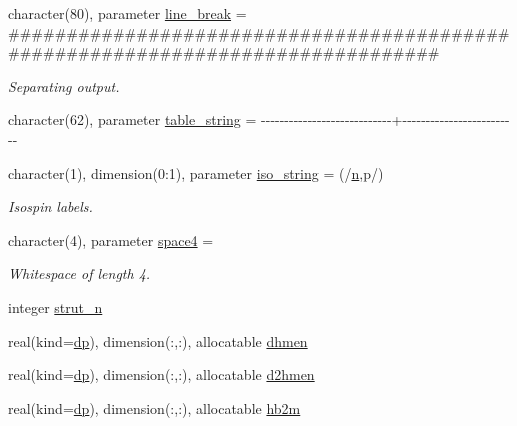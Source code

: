 \begin{DoxyCompactItemize}
character(80), parameter \mbox{\hyperlink{group__STRINGS_ga757aedae1ca22891e6971eee77226285}{line\+\_\+break}} = \textquotesingle{}\#\#\#\#\#\#\#\#\#\#\#\#\#\#\#\#\#\#\#\#\#\#\#\#\#\#\#\#\#\#\#\#\#\#\#\#\#\#\#\#\#\#\#\#\#\#\#\#\#\#\#\#\#\#\#\#\#\#\#\#\#\#\#\#\#\#\#\#\#\#\#\#\#\#\#\#\#\#\#\#\textquotesingle{}
\begin{DoxyCompactList}\small\item\em Separating output. \end{DoxyCompactList}\item 
character(62), parameter \mbox{\hyperlink{group__STRINGS_ga4074473b9d6e05d0b912b06d42301755}{table\+\_\+string}} = \textquotesingle{}-\/-\/-\/-\/-\/-\/-\/-\/-\/-\/-\/-\/-\/-\/-\/-\/-\/-\/-\/-\/-\/-\/-\/-\/-\/-\/-\/-\/+-\/-\/-\/-\/-\/-\/-\/-\/-\/-\/-\/-\/-\/-\/-\/-\/-\/-\/-\/-\/-\/-\/-\/-\/-\/\textquotesingle{}
\item 
character(1), dimension(0\+:1), parameter \mbox{\hyperlink{group__STRINGS_gaa642f410416bdb397b62d3844df96d6c}{iso\+\_\+string}} = (/\textquotesingle{}\mbox{\hyperlink{group__INPUT__PARS_ga2e69dbce49f3e83688fe80de2ce83724}{n}}\textquotesingle{},\textquotesingle{}p\textquotesingle{}/)
\begin{DoxyCompactList}\small\item\em Isospin labels. \end{DoxyCompactList}\item 
character(4), parameter \mbox{\hyperlink{group__STRINGS_ga0f73a365fff78bef9c51e7b776ab6184}{space4}} = \textquotesingle{} \textquotesingle{}
\begin{DoxyCompactList}\small\item\em Whitespace of length 4. \end{DoxyCompactList}\item 
integer \mbox{\hyperlink{group__STRUTINSKY_gac439f84f31aadb3d8940c87b8031f3c5}{strut\+\_\+n}}
\item 
real(kind=\mbox{\hyperlink{namespaceparameters_a52f8c6351fd79345d8811e065bcbbb37}{dp}}), dimension(\+:,\+:), allocatable \mbox{\hyperlink{group__STRUTINSKY_ga5b0cdd0835c3f087c5da53f73ad08bf3}{dhmen}}
\item 
real(kind=\mbox{\hyperlink{namespaceparameters_a52f8c6351fd79345d8811e065bcbbb37}{dp}}), dimension(\+:,\+:), allocatable \mbox{\hyperlink{group__STRUTINSKY_ga51f921a516a9571cb7f002e059909a30}{d2hmen}}
\item 
real(kind=\mbox{\hyperlink{namespaceparameters_a52f8c6351fd79345d8811e065bcbbb37}{dp}}), dimension(\+:,\+:), allocatable \mbox{\hyperlink{group__STRUTINSKY_ga4faafec43e7b862ce36b7c191f7a5b72}{hb2m}}

\end{DoxyCompactItemize}
